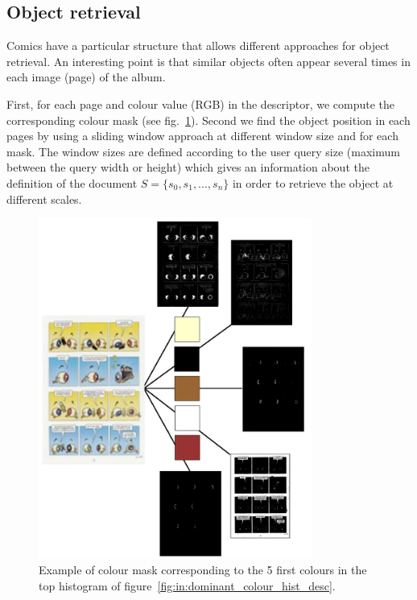 \subsection{Object retrieval}
Comics have a particular structure that allows different approaches for object retrieval. An interesting point is that similar objects often appear several times in each image (page) of the album.%

First, for each page and colour value (RGB) in the descriptor, we compute the corresponding colour mask (see fig.~\ref{fig:in:masks}). %
Second we find the object position in each pages by using a sliding window approach at different window size and for each mask. The window sizes are defined according to the user query size (maximum between the query width or height) which gives an information about the definition of the document $S=\{s_0,s_1,...,s_n\}$ in order to retrieve the object at different scales.


 \begin{figure}[!ht]  %
   \centering
  \includegraphics[width=0.8\textwidth]{masks.png}
  \caption[Colour mask corresponding to five colour of the query descriptor]{Example of colour mask corresponding to the 5 first colours in the top histogram of figure~\ref{fig:in:dominant_colour_hist_desc}.}
  \label{fig:in:masks}
 \end{figure}


